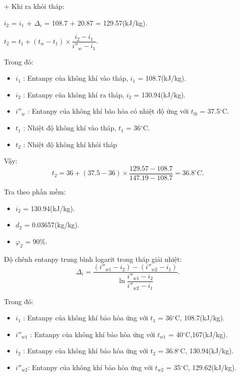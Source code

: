 + Khi ra khỏi tháp:

	$i_{2}$ = $i_{1}$ + $\Delta_{i}$ = 108.7 + 20.87 = 129.57(kJ/kg).
	
	$t_{2} = t_{1} + (t_{w} - t_{1}) \times \dfrac{i_{2} - i_{1}}{i''_{w} - i_{1}}$.
	
Trong đó:
\begin{itemize}
	\item $i_{1}$ : Entanpy của không khí vào tháp, $i_{1}$ = 108.7(kJ/kg).
	\item $i_{2}$ : Entanpy của không khí ra tháp, $i_{2}$ = 130.94(kJ/kg).
	\item $i''_{w}$ : Entanpy của không khí bão hòa có nhiệt độ ứng với $t_{tb}$ = 37.5$^{\circ}$C.
	\item $t_{1}$ : Nhiệt độ không khí vào tháp, $t_{1}$ = 36$^{\circ}$C.
	\item $t_{2}$ : Nhiệt độ không khí khỏi tháp
\end{itemize}
 Vậy:
 \begin{equation*}
 	t_{2} = 36 + (37.5 - 36 ) \times \dfrac{129.57 - 108.7}{147.19 - 108.7} = 36.8^{\circ}C.
 \end{equation*}

Tra theo phần mềm:
\begin{itemize}
	\item $i_{2}$ = 130.94(kJ/kg).
	\item $d_{2}$ = 0.03657(kg/kg).
	\item $\varphi_{2}$ = 90\%.
\end{itemize}

Độ chênh entanpy trung bình logarit trong tháp giải nhiệt:
\begin{equation*}
	\Delta_{i} = \dfrac{(i''_{w1} - i_{2}) - (i''_{w2} - i_{1}) }{\ln \dfrac{i''_{w1} - i_{2}}{i''_{w2} - i_{1}}}.
\end{equation*}

Trong đó:
\begin{itemize}
	\item $i_{1}$ : Entanpy của không khí bảo hòa ứng với $t_{1}$ = 36$^{\circ}$C, 108.7(kJ/kg).
	\item $i''_{w1}$ : Entanpy của không khí bảo hòa ứng với $t_{w1}$ = 40$^{\circ}$C,167(kJ/kg).
	\item $i_{2}$ : Entanpy của không khí bảo hòa ứng với $t_{2}$ = 36.8$^{\circ}$C, 130.94(kJ/kg).
	\item $i''_{w2}$: Entanpy của không khí bảo hòa ứng với $t_{w2}$ = 35$^{\circ}$C, 129.62(kJ/kg).
\end{itemize}

